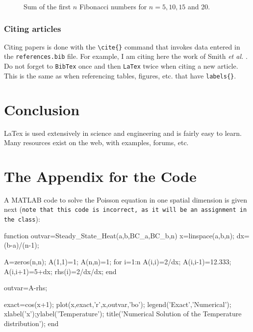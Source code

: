 \documentclass[12pt]{article}
\newcommand{\etal}{\textit{et al. }}
\begin{document}
\begin{figure}[h]
\begin{center}
\end{center}
\caption{Sum of the first $n$ Fibonacci numbers for $n=5, 10, 15$ and 20.} \label{fig::Domain}
\end{figure}


\subsubsection{Citing articles}
Citing papers is done with the \verb|\cite{}| command that invokes data entered in the \texttt{references.bib} file. For example, I am citing here the work of Smith \etal \cite{Smith;White;Raoul:06:A-numerical-method-o}. Do not forget to \texttt{BibTex} once and then \texttt{LaTex} twice when citing a new article. This is the same as when referencing tables, figures, etc. that have \verb|labels{}|.

\section{Conclusion}\label{sec::conclusion}
LaTex is used extensively in science and engineering and is fairly easy to learn. Many resources exist on the web, with examples, forums, etc.
\clearpage
\appendix
\section{The Appendix for the Code}\label{sec::appendix}
A MATLAB code to solve the Poisson equation in one spatial dimension is given next (\texttt{note that this code is incorrect, as it will be an assignment in the class}):
\begin{verbatimtab}
function outvar=Steady_State_Heat(a,b,BC_a,BC_b,n)
    x=linspace(a,b,n);
    dx=(b-a)/(n-1);
    
    A=zeros(n,n);
    A(1,1)=1; A(n,n)=1; 
    for i=1:n
        A(i,i)=2/dx; A(i,i-1)=12.333; A(i,i+1)=5+dx;
        rhs(i)=2/dx/dx;
    end
    
    outvar=A-rhs;
    
    exact=cos(x+1);
    plot(x,exact,'r',x,outvar,'bo');
    legend('Exact','Numerical');
    xlabel('x');ylabel('Temperature');
    title('Numerical Solution of the Temperature distribution');
end
\end{verbatimtab}


\newpage
\clearpage
\setcounter{page}{1} \pagestyle{empty}

\end{document}
